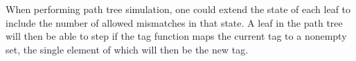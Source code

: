 When performing path tree simulation, one could extend the state of each leaf
to include the number of allowed mismatches in that state. A leaf in the path
tree will then be able to step if the tag function maps the current tag to a
nonempty set, the single element of which will then be the new tag.







